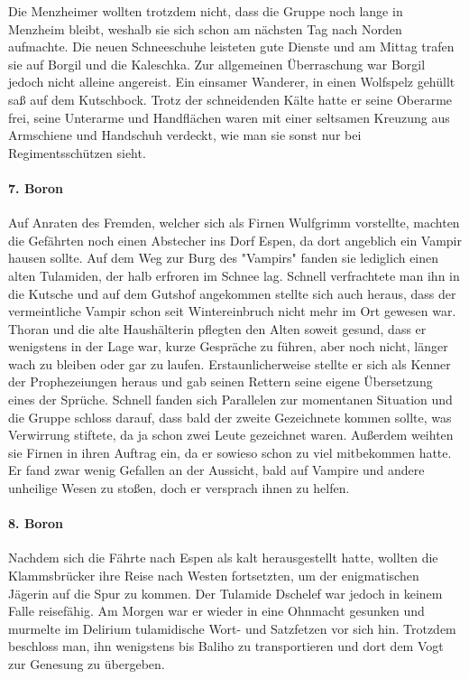 \documentclass[11pt]{scrreprt}
\begin{document}
Die Menzheimer wollten trotzdem nicht, dass die Gruppe noch lange in Menzheim bleibt, weshalb sie sich schon am nächsten Tag nach Norden aufmachte. Die neuen Schneeschuhe leisteten gute Dienste und am Mittag trafen sie auf Borgil und die Kaleschka. Zur allgemeinen Überraschung war Borgil jedoch nicht alleine angereist. Ein einsamer Wanderer, in einen Wolfspelz gehüllt saß auf dem Kutschbock. Trotz der schneidenden Kälte hatte er seine Oberarme frei, seine Unterarme und Handflächen waren mit einer seltsamen Kreuzung aus Armschiene und Handschuh verdeckt, wie man sie sonst nur bei Regimentsschützen sieht.

\paragraph{7. Boron}
Auf Anraten des Fremden, welcher sich als Firnen Wulfgrimm vorstellte, machten die Gefährten noch einen Abstecher ins Dorf Espen, da dort angeblich ein Vampir hausen sollte. Auf dem Weg zur Burg des "Vampirs" fanden sie lediglich einen alten Tulamiden, der halb erfroren im Schnee lag. Schnell verfrachtete man ihn in die Kutsche und auf dem Gutshof angekommen stellte sich auch heraus, dass der vermeintliche Vampir schon seit Wintereinbruch nicht mehr im Ort gewesen war. Thoran und die alte Haushälterin pflegten den Alten soweit gesund, dass er wenigstens in der Lage war, kurze Gespräche zu führen, aber noch nicht, länger wach zu bleiben oder gar zu laufen. Erstaunlicherweise stellte er sich als Kenner der Prophezeiungen heraus und gab seinen Rettern seine eigene Übersetzung eines der Sprüche. Schnell fanden sich Parallelen zur momentanen Situation und die Gruppe schloss darauf, dass bald der zweite Gezeichnete kommen sollte, was Verwirrung stiftete, da ja schon zwei Leute gezeichnet waren. Außerdem weihten sie Firnen in ihren Auftrag ein, da er sowieso schon zu viel mitbekommen hatte. Er fand zwar wenig Gefallen an der Aussicht, bald auf Vampire und andere unheilige Wesen zu stoßen, doch er versprach ihnen zu helfen.

\paragraph{8. Boron}
Nachdem sich die Fährte nach Espen als kalt herausgestellt hatte, wollten die Klammsbrücker ihre Reise nach Westen fortsetzten, um der enigmatischen Jägerin auf die Spur zu kommen. Der Tulamide Dschelef war jedoch in keinem Falle reisefähig. Am Morgen war er wieder in eine Ohnmacht gesunken und murmelte im Delirium tulamidische Wort- und Satzfetzen vor sich hin. Trotzdem beschloss man, ihn wenigstens bis Baliho zu transportieren und dort dem Vogt zur Genesung zu übergeben.
\end{document}
